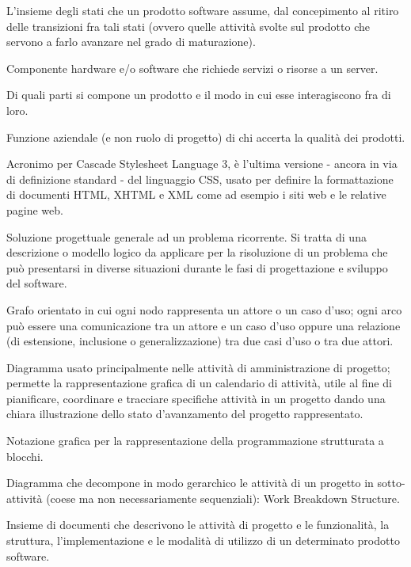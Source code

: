 \item[Ciclo di vita (di un prodotto)] L'insieme degli stati che un prodotto software assume, dal concepimento al ritiro delle transizioni fra tali stati (ovvero quelle attività svolte sul prodotto che servono a farlo avanzare nel grado di maturazione).
\item[Client] Componente hardware e/o software che richiede servizi o risorse a un server.
\item[Configurazione] Di quali parti si compone un prodotto e il modo in cui esse interagiscono fra di loro.
\item[Controllore della qualità] Funzione aziendale (e non ruolo di progetto) di chi accerta la qualità dei prodotti.
\item[CSS3] Acronimo per Cascade Stylesheet Language 3, è l'ultima versione - ancora in via di definizione standard - del linguaggio CSS, usato per definire la formattazione di documenti HTML, XHTML e XML come ad esempio i siti web e le relative pagine web.
\item[Design pattern] Soluzione progettuale generale ad un problema ricorrente. Si tratta di una descrizione o modello logico da applicare per la risoluzione di un problema che può presentarsi in diverse situazioni durante le fasi di progettazione e sviluppo del software.
\item[Diagramma dei casi d'uso] Grafo orientato in cui ogni nodo rappresenta un attore o un caso d'uso; ogni arco può essere una comunicazione tra un attore e un caso d'uso oppure una relazione (di estensione, inclusione o generalizzazione) tra due casi d'uso o tra due attori.
\item[Diagramma di Gantt] Diagramma usato principalmente nelle attività di amministrazione di progetto; permette la rappresentazione grafica di un calendario di attività, utile al fine di pianificare, coordinare e tracciare specifiche attività in un progetto dando una chiara illustrazione dello stato d’avanzamento del progetto rappresentato.
\item[Diagramma Nassi–Shneiderman] Notazione grafica per la rappresentazione della programmazione strutturata a blocchi. 
\item[Diagramma WBS] Diagramma che decompone in modo gerarchico le attività di un progetto in sotto-attività (coese ma non necessariamente sequenziali): Work Breakdown Structure.
\item[Documentazione] Insieme di documenti che descrivono le attività di progetto e le funzionalità, la struttura, l'implementazione e le modalità di utilizzo di un determinato prodotto software. 
